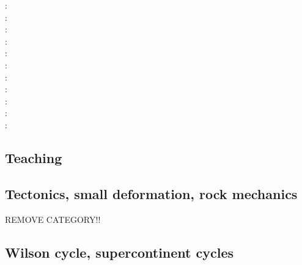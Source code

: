 \begin{scriptsize}
\twothousand: \cite{vavv00}\\
\twothousandone: \cite{vavv01}\\
\twothousandtwo: \cite{vavv02}\cite{vavv02b}\\
\twothousandfour: \cite{vavv04d}\\
\twothousandeight: \cite{pekh08}\cite{esfm08}\\
\twothousandeleven: \cite{cube11}\\
\twothousandtwelve: \cite{mapm12}\cite{ronb12}\\
\twothousandfifteen: \cite{gehm15}\cite{tarn15}\cite{ealw15}\\
\twothousandsixteen: \cite{chdf16}\cite{huwc16}\cite{hulh16}\\
\twothousandnineteen: \cite{sifg19}\cite{sams19b}\cite{malg19}\\
\twothousandtwenty: \cite{dawl20}
\end{scriptsize}

\subsection{Teaching} 

\begin{scriptsize}
\cite{grap11}
\cite{kerh14}
\cite{bemg19}
\end{scriptsize}

\subsection{Tectonics, small deformation, rock mechanics}
REMOVE CATEGORY!!
{\scriptsize
\cite{ilma93}
\cite{hept96}
}

\subsection{Wilson cycle, supercontinent cycles}

